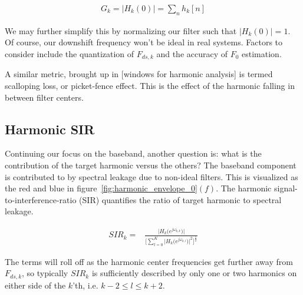 \documentclass [11pt, proquest] {uwthesis}[2015/03/03]
\begin{document}
\begin{align}
G_k = \Big| H_k(0) \Big| = \sum_n h_k[n]
\end{align}

We may further simplify this by normalizing our filter such that $\Big| H_k(0) \Big| = 1$.  Of course, our downshift frequency won't be ideal in real systems.  Factors to consider include the quantization of $F_{ds,k}$ and the accuracy of $F_0$ estimation.

A similar metric, brought up in [windows for harmonic analysis] is termed scalloping loss, or picket-fence effect.  This is the effect of the harmonic falling in between filter centers.  





\subsection{Harmonic SIR}

Continuing our focus on the baseband, another question is: what is the contribution of the target harmonic versus the others?  The baseband component is contributed to by spectral leakage due to non-ideal filters.  This is visualized as the red and blue in figure~\ref{fig:harmonic_envelope_0}$(f)$.  The harmonic signal-to-interference-ratio (SIR) quantifies the ratio of target harmonic to spectral leakage.

\begin{align}
SIR_k =& \frac{\Big| H_k\big(e^{j\omega_{k,k}}\big) \Big|} {\Bigg[ \sum\limits_{l=0}^K \Big|H_k\big(e^{j\omega_{k,l}}\big)\Big|^2 \Bigg] ^ \frac{1}{2}}
\end{align}

The terms will roll off as the harmonic center frequencies get further away from $F_{ds,k}$, so typically $SIR_k$ is sufficiently described by only one or two harmonics on either side of the $k$'th, i.e. $k-2 \leq l \leq k+2$.
\end{document}
